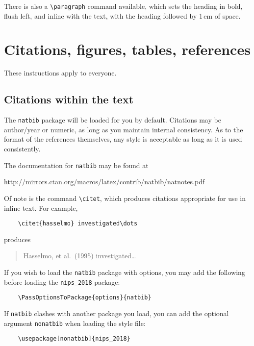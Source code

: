 \documentclass{article}
\begin{document}
	There is also a \verb+\paragraph+ command available, which sets the
	heading in bold, flush left, and inline with the text, with the
	heading followed by 1\,em of space.
	
	\section{Citations, figures, tables, references}
	\label{others}
	
	These instructions apply to everyone.
	
	\subsection{Citations within the text}
	
	The \verb+natbib+ package will be loaded for you by default.
	Citations may be author/year or numeric, as long as you maintain
	internal consistency.  As to the format of the references themselves,
	any style is acceptable as long as it is used consistently.
	
	The documentation for \verb+natbib+ may be found at
	\begin{center}
		\url{http://mirrors.ctan.org/macros/latex/contrib/natbib/natnotes.pdf}
	\end{center}
	Of note is the command \verb+\citet+, which produces citations
	appropriate for use in inline text.  For example,
	\begin{verbatim}
	\citet{hasselmo} investigated\dots
	\end{verbatim}
	produces
	\begin{quote}
		Hasselmo, et al.\ (1995) investigated\dots
	\end{quote}
	
	If you wish to load the \verb+natbib+ package with options, you may
	add the following before loading the \verb+nips_2018+ package:
	\begin{verbatim}
	\PassOptionsToPackage{options}{natbib}
	\end{verbatim}
	
	If \verb+natbib+ clashes with another package you load, you can add
	the optional argument \verb+nonatbib+ when loading the style file:
	\begin{verbatim}
	\usepackage[nonatbib]{nips_2018}
	\end{verbatim}
	
\end{document}
